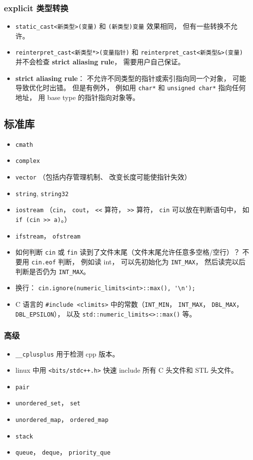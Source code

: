 \subsubsection{explicit 类型转换}
\begin{itemize}
\item \verb|static_cast<新类型>(变量)| 和 \verb|(新类型)变量| 效果相同， 但有一些转换不允许。
\item \verb|reinterpret_cast<新类型*>(变量指针)| 和 \verb|reinterpret_cast<新类型&>(变量)| 并不会检查 \textbf{strict aliasing rule}， 需要用户自己保证。
\item \textbf{strict aliasing rule}： 不允许不同类型的指针或索引指向同一个对象， 可能导致优化时出错。 但是有例外， 例如用 \verb|char*| 和 \verb|unsigned char*| 指向任何地址， 用 base type 的指针指向对象等。
\end{itemize}

\subsection{标准库}
\begin{itemize}
\item \verb|cmath|
\item \verb|complex|
\item \verb|vector| （包括内存管理机制、 改变长度可能使指针失效）
\item \verb|string|, \verb|string32|
\item \verb|iostream| （\verb|cin|， \verb|cout|， \verb|<<| 算符， \verb|>>| 算符， \verb|cin| 可以放在判断语句中， 如 \verb|if (cin >> a)|。）
\item \verb|ifstream|， \verb|ofstream|
\item 如何判断 \verb|cin| 或 \verb|fin| 读到了文件末尾（文件末尾允许任意多空格/空行）？ 不要用 \verb|cin.eof| 判断， 例如读 int， 可以先初始化为 \verb|INT_MAX|， 然后读完以后判断是否仍为 \verb|INT_MAX|。
\item 换行： \verb|cin.ignore(numeric_limits<int>::max(), '\n');|
\item C 语言的 \verb|#include <climits>| 中的常数（\verb|INT_MIN|， \verb|INT_MAX|， \verb|DBL_MAX|， \verb|DBL_EPSILON|）， 以及 \verb|std::numeric_limits<>::max()| 等。
\end{itemize}

\subsubsection{高级}
\begin{itemize}
\item \verb|__cplusplus| 用于检测 cpp 版本。
\item linux 中用 \verb|<bits/stdc++.h>| 快速 include 所有 C 头文件和 STL 头文件。
\item \verb|pair|
\item \verb|unordered_set|， \verb|set|
\item \verb|unordered_map|， \verb|ordered_map|
\item \verb|stack|
\item \verb|queue|， \verb|deque|， \verb|priority_que|
\end{itemize}

